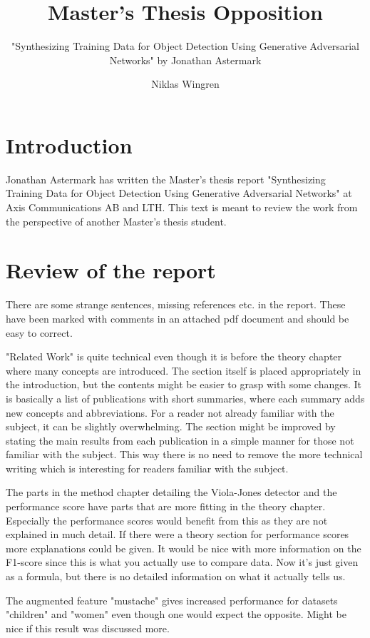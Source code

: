 \documentclass[10pt,a4paper]{scrartcl}
\author{Niklas Wingren}
\title{Master's Thesis Opposition}
\subtitle{"Synthesizing Training Data for Object Detection Using Generative Adversarial Networks" by Jonathan Astermark}
\begin{document}
	\maketitle
	
	\section*{Introduction}
	Jonathan Astermark has written the Master's thesis report "Synthesizing Training Data for Object Detection Using Generative Adversarial Networks" at Axis Communications AB and LTH. This text is meant to review the work from the perspective of another Master's thesis student.
	
	\section*{Review of the report}
	There are some strange sentences, missing references etc. in the report. These have been marked with comments in an attached pdf document and should be easy to correct.
	
	"Related Work" is quite technical even though it is before the theory chapter where many concepts are introduced. The section itself is placed appropriately in the introduction, but the contents might be easier to grasp with some changes. It is basically a list of publications with short summaries, where each summary adds new concepts and abbreviations. For a reader not already familiar with the subject, it can be slightly overwhelming. The section might be improved by stating the main results from each publication in a simple manner for those not familiar with the subject. This way there is no need to remove the more technical writing which is interesting for readers familiar with the subject.
	
	The parts in the method chapter detailing the Viola-Jones detector and the performance score have parts that are more fitting in the theory chapter. Especially the performance scores would benefit from this as they are not explained in much detail. If there were a theory section for performance scores more explanations could be given. It would be nice with more information on the F1-score since this is what you actually use to compare data. Now it’s just given as a formula, but there is no detailed information on what it actually tells us.
	
	The augmented feature "mustache" gives increased performance for datasets "children" and "women" even though one would expect the opposite. Might be nice if this result was discussed more.
	
\end{document}
